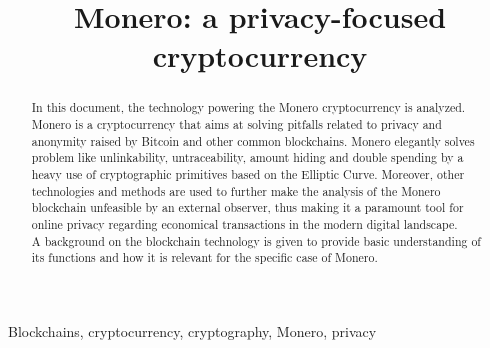 \documentclass[conference]{IEEEtran}
\begin{document}
\title{Monero: a privacy-focused cryptocurrency}

\author{
}

\maketitle

\begin{abstract}
In this document, the technology powering the Monero cryptocurrency is analyzed. Monero is a cryptocurrency that aims at solving pitfalls related to privacy and anonymity raised by Bitcoin and other common blockchains. Monero elegantly solves problem like unlinkability, untraceability, amount hiding and double spending by a heavy use of cryptographic primitives based on the Elliptic Curve. Moreover, other technologies and methods are used to further make the analysis of the Monero blockchain unfeasible by an external observer, thus making it a paramount tool for online privacy regarding economical transactions in the modern digital landscape.\\
A background on the blockchain technology is given to provide basic understanding of its functions and how it is relevant for the specific case of Monero.
\end{abstract}

\begin{IEEEkeywords}
Blockchains, cryptocurrency, cryptography, Monero, privacy
\end{IEEEkeywords}


\end{document}
